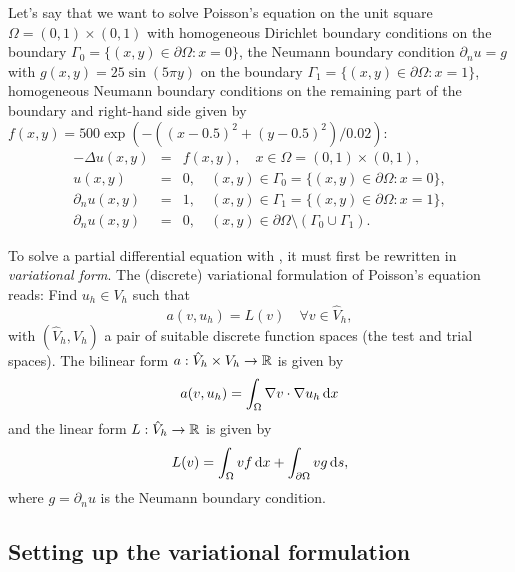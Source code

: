 Let's say that we want to solve Poisson's equation on the unit square
$\Omega = (0,1) \times (0,1)$ with homogeneous Dirichlet boundary
conditions on the boundary $\Gamma_0 = \{(x, y) \in \partial \Omega : x = 0\}$,
the Neumann boundary condition $\partial_n u = g$ 
with $g(x, y) = 25 \sin(5\pi y)$
on the boundary $\Gamma_1 = \{(x, y) \in \partial \Omega : x = 1\}$,
homogeneous Neumann boundary conditions on the remaining part of the boundary
and right-hand side given by $f(x, y) = 500 \exp(-((x-0.5)^2 +
(y-0.5)^2)/0.02)$:
\begin{eqnarray} \label{eq:poisson,quickstart}
  - \Delta u(x, y) &=& f(x, y), \quad
  x \in \Omega = (0,1) \times (0,1), \\
  u(x, y) &=& 0, \quad
  (x, y) \in \Gamma_0 = \{(x, y) \in \partial \Omega : x = 0\}, \\
  \partial_n u(x, y) &=& 1, \quad
  (x, y) \in \Gamma_1 = \{(x, y) \in \partial \Omega : x = 1\}, \\
  \partial_n u(x, y) &=& 0, \quad
  (x, y) \in \partial \Omega \setminus (\Gamma_0 \cup \Gamma_1).
\end{eqnarray}


To solve a partial differential equation with \dolfin{}, it must first
be rewritten in \emph{variational form}.  The (discrete) variational
formulation of Poisson's equation reads: Find $u_h \in V_h$ such that
\begin{equation} \label{eq:varform}
  a(v, u_h) = L(v) \quad \forall v\in \hat{V}_h, 
\end{equation}
with $(\hat{V}_h, V_h)$ a pair of suitable discrete function spaces
(the test and trial spaces). The bilinear form $a : \hat{V}_h \times V_h
\rightarrow \mathbb{R}$ is given by
\begin{equation}
  a(v, u_h) = \int_{\Omega} \nabla v \cdot \nabla u_h \, \mathrm{d}x
\end{equation}
and the linear form $L : \hat{V}_h \rightarrow \mathbb{R}$ is given by
\begin{equation}
  L(v) = \int_{\Omega} v f \, \mathrm{d}x + \int_{\partial \Omega} v g \, \mathrm{d}s,
\end{equation}
where $g = \partial_n u$ is the Neumann boundary condition.

\subsection{Setting up the variational formulation}


